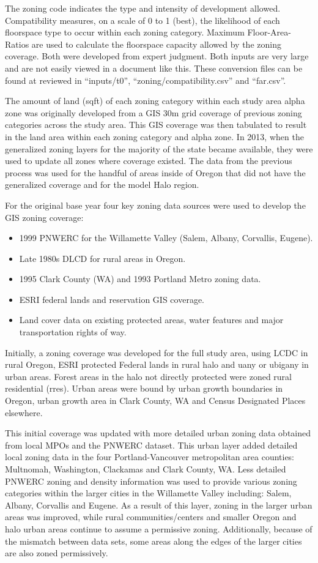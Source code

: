 The zoning code indicates the type and intensity of development allowed. Compatibility measures, on a scale of 0 to 1 (best), the likelihood of each floorspace type to occur within each zoning category. Maximum Floor-Area-Ratios are used to calculate the floorspace capacity allowed by the zoning coverage. Both were developed from expert judgment. Both inputs are very large and are not easily viewed in a document like this.  These conversion files can be found at reviewed in ``inputs/t0'', ``zoning/compatibility.csv'' and ``far.csv''.

The amount of land (sqft) of each zoning category within each study area alpha zone was originally developed from a GIS 30m grid coverage of previous zoning categories across the study area. This GIS coverage was then tabulated to result in the land area within each zoning category and alpha zone. In 2013, when the generalized zoning layers for the majority of the state became available, they were used to update all zones where coverage existed.  The data from the previous process was used for the handful of areas inside of Oregon that did not have the generalized coverage and for the model Halo region.

For the original base year four key zoning data sources were used to develop the GIS zoning coverage: 
\begin{itemize}
\item 1999 PNWERC for the Willamette Valley (Salem, Albany, Corvallis, Eugene).
\item Late 1980s DLCD for rural areas in Oregon.
\item 1995 Clark County (WA) and 1993 Portland Metro zoning data.
\item ESRI federal lands and reservation GIS coverage.
\item Land cover data on existing protected areas, water features and major transportation rights of way.
\end{itemize}

Initially, a zoning coverage was developed for the full study area, using LCDC in rural Oregon, ESRI protected Federal lands in rural halo and uany or ubigany in urban areas. Forest areas in the halo not directly protected were zoned rural residential (rres). Urban areas were bound by urban growth boundaries in Oregon, urban growth area in Clark County, WA and Census Designated Places elsewhere.

This initial coverage was updated with more detailed urban zoning data obtained from local MPOs and the PNWERC dataset. This urban layer added detailed local zoning data in the four Portland-Vancouver metropolitan area counties: Multnomah, Washington, Clackamas and Clark County, WA. Less detailed PNWERC zoning and density information was used to provide various zoning categories within the larger cities in the Willamette Valley including: Salem, Albany, Corvallis and Eugene. As a result of this layer, zoning in the larger urban areas was improved, while rural communities/centers and smaller Oregon and halo urban areas continue to assume a permissive zoning. Additionally, because of the mismatch between data sets, some areas along the edges of the larger cities are also zoned permissively.

